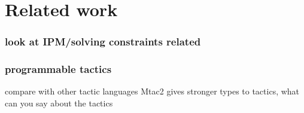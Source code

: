 \chapter{Related work}

\subsection{look at IPM/solving constraints related}

\subsection{programmable tactics}

compare with other tactic languages
Mtac2 gives stronger types to tactics, what can you say about the tactics